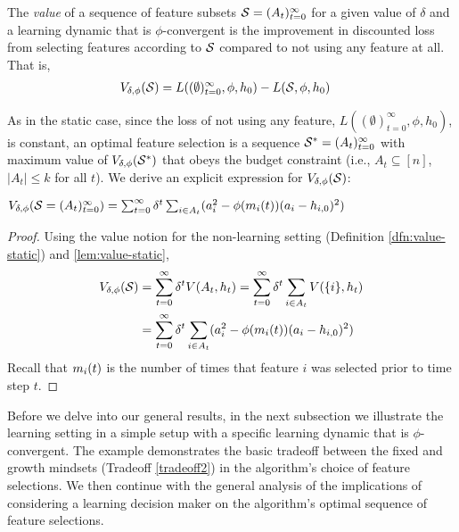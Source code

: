 \begin{definition} \label{dfn:value-learning}
  The {\em value} of a sequence of feature subsets $\mathcal{S} = (A_t)_{t=0}^\infty$ for a given value of $\delta$ and a learning dynamic that is $\phi$-convergent is
   the improvement in discounted loss 
    from selecting features according to $\mathcal{S}$  compared to not using any feature at all. That is,  
\begin{align*}
V_{\delta,\phi}(\mathcal{S}) &=  L((\emptyset)_{t=0}^\infty,\phi,h_0) -  L(\mathcal{S},\phi,h_0) 
\end{align*}
\end{definition}
As in the static case, since the loss of not using any feature, $L((\emptyset)_{t=0}^\infty,\phi,h_0)$, is constant, an optimal feature selection is a sequence $\mathcal{S}^* = (A_t)_{t=0}^\infty$ with maximum value of $V_{\delta,\phi}(\mathcal{S^*})$ that obeys the budget constraint (i.e., $A_t \subseteq [n]$, $|A_t| \leq k$ for all $t$). We derive an explicit expression for $V_{\delta,\phi}(\mathcal{S})$:
\begin{claim} \label{clm:val-learn-seq}
$V_{\delta,\phi}(\mathcal{S}=(A_t)_{t=0}^\infty) 
= \sum_{t=0}^\infty \delta^t \sum_{i\in A_t} (a_i^2-\phi(m_{i}(t))(a_i-h_{i,0})^2)$
\end{claim}
\begin{proof}
Using the value notion for the non-learning setting (Definition \ref{dfn:value-static}) and \cref{lem:value-static},
\begin{align} \label{eq:value-learning}
V_{\delta,\phi}(\mathcal{S}) 
& = \sum_{t=0}^\infty \delta^t V(A_t,h_t) \notag 
= \sum_{t=0}^\infty \delta^t \sum_{i\in A_t} V(\{i\},h_{t}) \nonumber \\
&= \sum_{t=0}^\infty \delta^t \sum_{i\in A_t} (a_i^2-\phi(m_{i}(t))(a_i-h_{i,0})^2)
\end{align}
Recall that $m_{i}(t)$ is the number of times that feature $i$ was selected prior to time step $t$.
\end{proof}


Before we delve into our general results, in the next subsection 
we illustrate the learning setting in a simple setup with a specific learning dynamic that is $\phi$-convergent. The example demonstrates 
the basic tradeoff between the fixed and growth mindsets (Tradeoff \ref{tradeoff2}) in the algorithm's choice of feature selections. We then  continue with the general analysis of the implications of considering a learning decision maker on the algorithm's optimal sequence of feature selections. 



